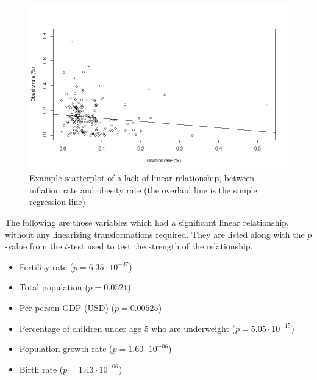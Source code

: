 \documentclass[oneside,12pt]{report}
\begin{document}
\begin{figure}
\centering
\label{fig:inflation-obesity-scatter}
\includegraphics[width=\textwidth]{inflation-obrate-scatter.png}
\caption[Scatterplot of a lack of linear relationship]{Example scatterplot of a lack of linear relationship, between inflation rate and obesity rate (the overlaid line is the simple regression line)}
\end{figure}

The following are those variables which had a significant linear relationship, without any linearizing transformations required. They are listed along with the $p$-value from the $t$-test used to test the strength of the relationship.


\begin{itemize}
\item Fertility rate (\begin{math}p=6.35\cdot10^{-07}\end{math})
\item Total population (\begin{math}p=0.0521\end{math})
\item Per person GDP (USD) (\begin{math}p=0.00525\end{math})
\item Percentage of children under age 5 who are underweight (\begin{math}p=5.05\cdot10^{-15}\end{math})
\item Population growth rate (\begin{math}p=1.60\cdot10^{-06}\end{math})
\item Birth rate (\begin{math}p=1.43\cdot10^{-06}\end{math})
\end{itemize}
\end{document}
